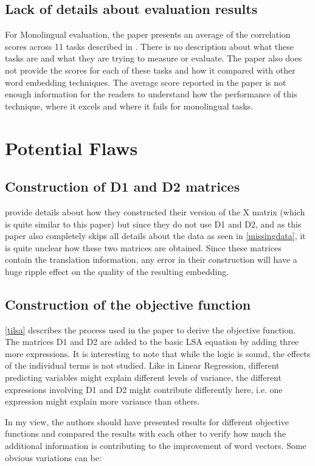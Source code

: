 \documentclass[11pt]{article}
\begin{document}
\subsection{Lack of details about evaluation results}
For Monolingual evaluation, the paper presents an average of the correlation scores across 11 tasks described in \cite{faruqui2014community}. There is no description about what these tasks are and what they are trying to measure or evaluate. The paper also does not provide the scores for each of these tasks and how it compared with other word embedding techniques. The average score reported in the paper is not enough information for the readers to understand how the performance of this technique, where it excels and where it fails for monolingual tasks.

\section{Potential Flaws}
\subsection{Construction of D1 and D2 matrices}
\cite{faruqui2014improving} provide details about how they constructed their version of the X matrix (which is quite similar to this paper) but since they do not use D1 and D2, and as this paper also completely skips all details about the data as seen in \ref{missingdata}, it is quite unclear how these two matrices are obtained. Since these matrices contain the translation information, any error in their construction will have a huge ripple effect on the quality of the resulting embedding.

\subsection{Construction of the objective function}
\ref{tilsa} describes the process used in the paper to derive the objective function. The matrices D1 and D2 are added to the basic LSA equation by adding three more expressions. It is interesting to note that while the logic is sound, the effects of the individual terms is not studied. Like in Linear Regression, different predicting variables might explain different levels of variance, the different expressions involving D1 and D2 might contribute differently here, i.e. one expression might explain more variance than others.

In my view, the authors should have presented results for different objective functions and compared the results with each other to verify how much the additional information is contributing to the improvement of word vectors. Some obvious variations can be:
\end{document}
